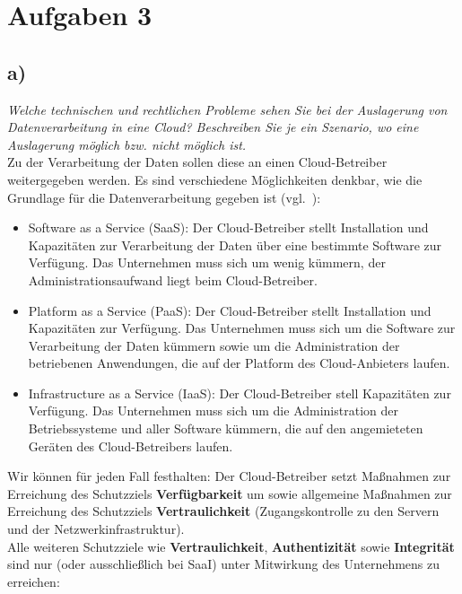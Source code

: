 \chapter{Aufgaben 3}

\section{a)}

\textit{Welche technischen und rechtlichen Probleme sehen Sie bei der Auslagerung von
Datenverarbeitung in eine Cloud? Beschreiben Sie je ein Szenario, wo eine Auslagerung möglich bzw. nicht möglich ist.}\\

\noindent
Zu der Verarbeitung der Daten sollen diese an einen Cloud-Betreiber weitergegeben werden.
Es sind verschiedene Möglichkeiten denkbar, wie die Grundlage für die Datenverarbeitung gegeben ist (vgl.~\cite[60]{ITS6}):

\begin{itemize}
    \itemsep0.5em
    \item Software as a Service (SaaS): Der Cloud-Betreiber stellt Installation und Kapazitäten zur Verarbeitung der Daten über eine bestimmte Software zur Verfügung.
    Das Unternehmen muss sich um wenig kümmern, der Administrationsaufwand liegt beim Cloud-Betreiber.
    \item Platform as a Service (PaaS): Der Cloud-Betreiber stellt Installation und Kapazitäten zur Verfügung.
    Das Unternehmen muss sich um die Software zur Verarbeitung der Daten kümmern sowie um die Administration der betriebenen Anwendungen, die auf der Platform des Cloud-Anbieters laufen.
    \item Infrastructure as a Service (IaaS): Der Cloud-Betreiber stell Kapazitäten zur Verfügung.
    Das Unternehmen muss sich um die Administration der Betriebssysteme und aller Software kümmern, die auf den angemieteten Geräten des Cloud-Betreibers laufen.
\end{itemize}

\noindent
Wir können für jeden Fall festhalten: Der Cloud-Betreiber setzt Maßnahmen zur Erreichung des Schutzziels \textbf{Verfügbarkeit} um sowie allgemeine Maßnahmen zur Erreichung des Schutzziels \textbf{Vertraulichkeit} (Zugangskontrolle zu den Servern und der Netzwerkinfrastruktur).\\
Alle weiteren Schutzziele wie \textbf{Vertraulichkeit}, \textbf{Authentizität} sowie \textbf{Integrität} sind nur (oder ausschließlich bei SaaI) unter Mitwirkung des Unternehmens zu erreichen:

